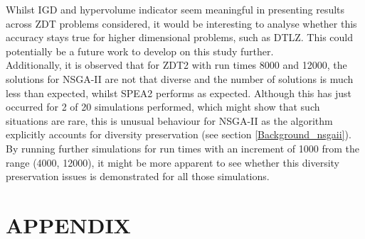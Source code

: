 \documentclass[sigconf, nonacm, preprint]{acmart}
\begin{document}
Whilst IGD and hypervolume indicator seem meaningful in presenting results across ZDT problems considered, it would be interesting to analyse whether this accuracy stays true for higher dimensional problems, such as DTLZ. This could potentially be a future work to develop on this study further. \\
Additionally, it is observed that for ZDT2 with run times 8000 and 12000, the solutions for NSGA-II are not that diverse and the number of solutions is much less than expected, whilst SPEA2 performs as expected. Although this has just occurred for 2 of 20 simulations performed, which might show that such situations are rare, this is unusual behaviour for NSGA-II as the algorithm explicitly accounts for diversity preservation (see section \ref{Background_nsgaii}). By running further simulations for run times with an increment of 1000 from the range (4000, 12000), it might be more apparent to see whether this diversity preservation issues is demonstrated for all those simulations. 

 

\vfill\vfill\vfill\vfill
\onecolumn
\appendix
\section*{APPENDIX}
\end{document}
